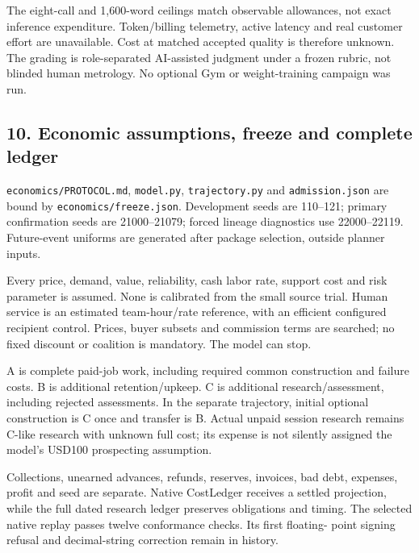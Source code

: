 \documentclass[
  10pt,
]{article}
\let\OriginalSubsection\subsection
\renewcommand{\subsection}{\needspace{6\baselineskip}\OriginalSubsection}
\begin{document}
The eight-call and 1,600-word ceilings match observable allowances, not
exact inference expenditure. Token/billing telemetry, active latency and
real customer effort are unavailable. Cost at matched accepted quality
is therefore unknown. The grading is role-separated AI-assisted judgment
under a frozen rubric, not blinded human metrology. No optional Gym or
weight-training campaign was run.

\hypertarget{economic-assumptions-freeze-and-complete-ledger}{%
\subsection{10. Economic assumptions, freeze and complete
ledger}\label{economic-assumptions-freeze-and-complete-ledger}}

\texttt{economics/\allowbreak{}PROTOCOL.\allowbreak{}md}, \texttt{model.\allowbreak{}py},
\texttt{trajectory.\allowbreak{}py} and \texttt{admission.\allowbreak{}json} are bound by
\texttt{economics/\allowbreak{}freeze.\allowbreak{}json}. Development seeds are 110--121; primary
confirmation seeds are 21000--21079; forced lineage diagnostics use
22000--22119. Future-event uniforms are generated after package
selection, outside planner inputs.

Every price, demand, value, reliability, cash labor rate, support cost
and risk parameter is assumed. None is calibrated from the small source
trial. Human service is an estimated team-hour/rate reference, with an
efficient configured recipient control. Prices, buyer subsets and
commission terms are searched; no fixed discount or coalition is
mandatory. The model can stop.

A is complete paid-job work, including required common construction and
failure costs. B is additional retention/upkeep. C is additional
research/assessment, including rejected assessments. In the separate
trajectory, initial optional construction is C once and transfer is B.
Actual unpaid session research remains C-like research with unknown full
cost; its expense is not silently assigned the model's USD100
prospecting assumption.

Collections, unearned advances, refunds, reserves, invoices, bad debt,
expenses, profit and seed are separate. Native CostLedger receives a
settled projection, while the full dated research ledger preserves
obligations and timing. The selected native replay passes twelve
conformance checks. Its first floating- point signing refusal and
decimal-string correction remain in history.
\end{document}
